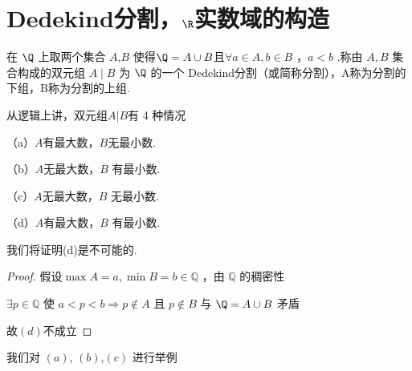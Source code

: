 \section{Dedekind分割，$\R$实数域的构造}
\begin{definition}\label{defofded}
	在 $\Q$ 上取两个集合 $A$,$B$ 使得$\Q=A \cup B$且$\forall a \in A, b \in B$ ，$a<b$ .称由 $A, B$ 集合构成的双元组 $A \mid B$ 为 $\Q$ 的一个 Dedekind分割（或简称分割），A称为分割的下组，B称为分割的上组.
	
\end{definition}
从逻辑上讲，双元组$A|B$有 4 种情况

（a）$A$有最大数，$B$无最小数.

（b）$A$无最大数，$B$ 有最小数.

（c）$A$无最大数，$B$ 无最小数.

（d）$A$有最大数，$B$ 有最小数.

我们将证明(d)是不可能的.
\begin{proof}
	假设$\max A=a, \min B=b \in \mathbb{Q}$ ，由 $\mathbb{Q}$ 的稠密性
	
	$\exists p \in \mathbb{Q}$ 使 $a<p<b \Rightarrow p \notin A$ 且 $p \notin B$ 与 $\Q=A \cup B$ 矛盾
	
	故$(d)$不成立
	
	
\end{proof}
我们对 $(a)$,  $(b)$,$(c)$ 进行举例

